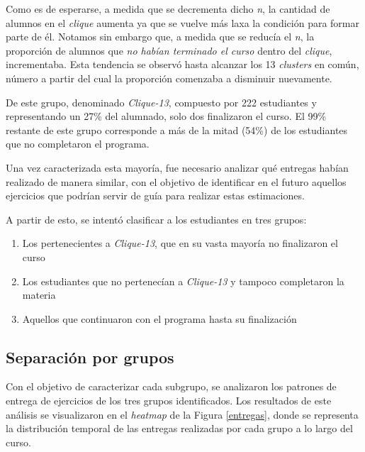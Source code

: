 \documentclass[11pt,a4paper,twoside,openany]{tesis}
\begin{document}
Como es de esperarse, a medida que se decrementa dicho \emph{n}, la cantidad de alumnos en el \emph{clique} aumenta ya que se vuelve más laxa la condición para formar parte de él. Notamos sin embargo que, a medida que se reducía el \emph{n}, la proporción de alumnos que \emph{no habían terminado el curso} dentro del \emph{clique}, incrementaba.  Esta tendencia se observó hasta alcanzar los 13 \emph{clusters} en común, número a partir del cual la proporción comenzaba a disminuir nuevamente.

De este grupo, denominado \emph{Clique-13}, compuesto por 222 estudiantes y representando un 27\% del alumnado, solo dos finalizaron el curso. El 99\% restante de este grupo corresponde a más de la mitad (54\%) de los estudiantes que no completaron el programa.

Una vez caracterizada esta mayoría, fue necesario analizar qué entregas habían realizado de manera similar, con el objetivo de identificar en el futuro aquellos ejercicios que podrían servir de guía para realizar estas estimaciones.

A partir de esto, se intentó clasificar a los estudiantes en tres grupos:

\begin{enumerate}
    \item Los pertenecientes a \emph{Clique-13}, que en su vasta mayoría no finalizaron el curso
    \item Los estudiantes que no pertenecían a \emph{Clique-13} y tampoco completaron la materia
    \item Aquellos que continuaron con el programa hasta su finalización
\end{enumerate}

\newpage
\subsection{Separación por grupos}\textbf{ }

Con el objetivo de caracterizar cada subgrupo, se analizaron los patrones de entrega de ejercicios de los tres grupos identificados. Los resultados de este análisis se visualizaron en el \emph{heatmap} de la Figura \ref{entregas}, donde se representa la distribución temporal de las entregas realizadas por cada grupo a lo largo del curso.
\end{document}

